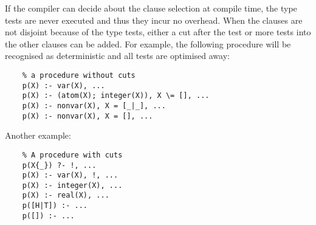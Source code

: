 If the compiler can decide about the clause selection at compile time,
the type tests are never executed and thus they incur no overhead.
When the clauses are not disjoint because of the type tests, either a cut
after the test or more tests into the other clauses can be added.
For example, the following procedure will be recognised as deterministic
and all tests are optimised away:

\begin{verbatim}
    % a procedure without cuts
    p(X) :- var(X), ...
    p(X) :- (atom(X); integer(X)), X \= [], ...
    p(X) :- nonvar(X), X = [_|_], ...
    p(X) :- nonvar(X), X = [], ...
\end{verbatim}

Another example:
\begin{verbatim}
    % A procedure with cuts
    p(X{_}) ?- !, ...
    p(X) :- var(X), !, ...
    p(X) :- integer(X), ...
    p(X) :- real(X), ...
    p([H|T]) :- ...
    p([]) :- ...
\end{verbatim}




